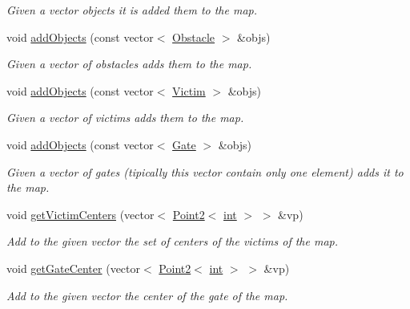\begin{DoxyCompactItemize}
\begin{DoxyCompactList}\small\item\em Given a vector objects it is added them to the map. \end{DoxyCompactList}\item 
void \mbox{\hyperlink{class_mapp_a346993a223bdfec975bb6365ef640c2c}{add\+Objects}} (const vector$<$ \mbox{\hyperlink{class_obstacle}{Obstacle}} $>$ \&objs)
\begin{DoxyCompactList}\small\item\em Given a vector of obstacles adds them to the map. \end{DoxyCompactList}\item 
void \mbox{\hyperlink{class_mapp_a46385479c68f30deb76adbf9a5cff9c3}{add\+Objects}} (const vector$<$ \mbox{\hyperlink{class_victim}{Victim}} $>$ \&objs)
\begin{DoxyCompactList}\small\item\em Given a vector of victims adds them to the map. \end{DoxyCompactList}\item 
void \mbox{\hyperlink{class_mapp_a99b3e0e922c4cd5416343ad7e08d8e72}{add\+Objects}} (const vector$<$ \mbox{\hyperlink{class_gate}{Gate}} $>$ \&objs)
\begin{DoxyCompactList}\small\item\em Given a vector of gates (tipically this vector contain only one element) adds it to the map. \end{DoxyCompactList}\item 
void \mbox{\hyperlink{class_mapp_a3b3ad207536bfb80c9ea2fd254bfdd80}{get\+Victim\+Centers}} (vector$<$ \mbox{\hyperlink{class_point2}{Point2}}$<$ \mbox{\hyperlink{draw_8hh_aa620a13339ac3a1177c86edc549fda9b}{int}} $>$ $>$ \&vp)
\begin{DoxyCompactList}\small\item\em Add to the given vector the set of centers of the victims of the map. \end{DoxyCompactList}\item 
void \mbox{\hyperlink{class_mapp_a7b17d1a5e8567021465397088e1dea8d}{get\+Gate\+Center}} (vector$<$ \mbox{\hyperlink{class_point2}{Point2}}$<$ \mbox{\hyperlink{draw_8hh_aa620a13339ac3a1177c86edc549fda9b}{int}} $>$ $>$ \&vp)
\begin{DoxyCompactList}\small\item\em Add to the given vector the center of the gate of the map. \end{DoxyCompactList}\item 

\end{DoxyCompactItemize}
